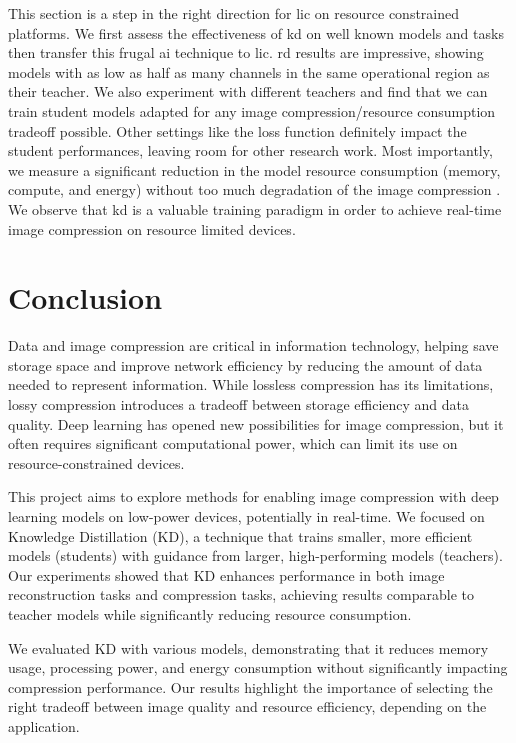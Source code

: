 \documentclass{article}
\begin{document}
This section is a step in the right direction for \acrshort{lic} on resource constrained platforms. We first assess the effectiveness of \acrshort{kd} on well known models and tasks then transfer this frugal \acrshort{ai} technique to \acrshort{lic}. \acrshort{rd} results are impressive, showing models with as low as half as many channels in the same operational region as their teacher. We also experiment with different teachers and find that we can train student models adapted for any image compression/resource consumption tradeoff possible. Other settings like the loss function definitely impact the student performances, leaving room for other research work. Most importantly, we measure a significant reduction in the model resource consumption (memory, compute, and energy) without too much degradation of the image compression . We observe that \acrshort{kd} is a valuable training paradigm in order to achieve real-time image compression on resource limited devices.

\section{Conclusion}
Data and image compression are critical in information technology, helping save storage space and improve network efficiency by reducing the amount of data needed to represent information. While lossless compression has its limitations, lossy compression introduces a tradeoff between storage efficiency and data quality. Deep learning has opened new possibilities for image compression, but it often requires significant computational power, which can limit its use on resource-constrained devices.

This project aims to explore methods for enabling image compression with deep learning models on low-power devices, potentially in real-time. We focused on Knowledge Distillation (KD), a technique that trains smaller, more efficient models (students) with guidance from larger, high-performing models (teachers). Our experiments showed that KD enhances performance in both image reconstruction tasks and compression tasks, achieving results comparable to teacher models while significantly reducing resource consumption.

We evaluated KD with various models, demonstrating that it reduces memory usage, processing power, and energy consumption without significantly impacting compression performance. Our results highlight the importance of selecting the right tradeoff between image quality and resource efficiency, depending on the application.
\end{document}
